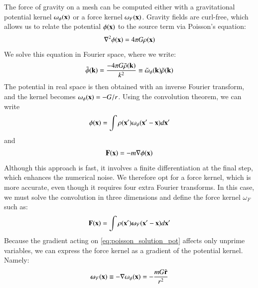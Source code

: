 \documentclass[useAMS,usenatbib]{mn2e}
\begin{document}
The force of gravity on a mesh can be computed either with a gravitational potential  kernel $\omega_{\phi} ({\bf x})$
  or a force  kernel $\omega_{F} ({\bf x})$.
Gravity fields are curl-free, which allows us to relate the potential $\phi({\bf x})$ to the source term via Poisson's equation: 
\begin{eqnarray}
\nabla^{2}\phi({\bf x}) = 4 \pi G \rho({\bf x})
\label{eq:poisson}
\end{eqnarray}
We solve this equation in Fourier space, where we write:
\begin{eqnarray}
 \tilde{\phi}({\bf k}) = \frac{-4 \pi G \tilde{\rho}({\bf k})}{k^{2}} \equiv \tilde{\omega}_{\phi}({\bf k})\tilde{\rho}({\bf k})
\label{eq:poissonFourier}
\end{eqnarray}
The potential in real space is then obtained with an inverse Fourier transform, and the kernel becomes $\omega_{\phi} ({\bf x}) = -G/r$.
Using the convolution theorem, we can write
\begin{eqnarray}
 \phi({\bf x}) = \int \rho({\bf x'}) \omega_{\phi}({\bf x'} - {\bf x}) d{\bf x'}   
\label{eq:poisson_solution_pot}
\end{eqnarray}
and
\begin{eqnarray}
{\bf F}({\bf x}) = - m {\bf \nabla} \phi({\bf x}) 
\label{eq:Force_sol}
\end{eqnarray}
Although this approach is fast, it involves a finite differentiation at the final step, which enhances the numerical noise.
We therefore opt for a force kernel, which is more accurate, even though it requires four extra Fourier transforms.
In this case, we must solve the convolution in three dimensions and define the force kernel {\boldmath $\omega$}$_{F}$ such as:
\begin{eqnarray}
 {\bf F}({\bf x}) =  \int \rho({\bf x'}) \mbox{\boldmath $\omega$}_{F}({\bf x'} - {\bf x}) d{\bf x'}                                      
\label{eq:poisson_solution_force}
\end{eqnarray}
Because the gradient acting on \ref{eq:poisson_solution_pot} affects only unprime variables, we can express the force kernel as a gradient of the potential kernel. Namely:  
\begin{eqnarray}
\mbox{\boldmath $\omega$}_{F}({\bf x}) \equiv - {\bf \nabla}\omega_{\phi}({\bf x}) = - \frac{mG \hat{\bf r}}{r^{2}}
\end{eqnarray}
\end{document}
